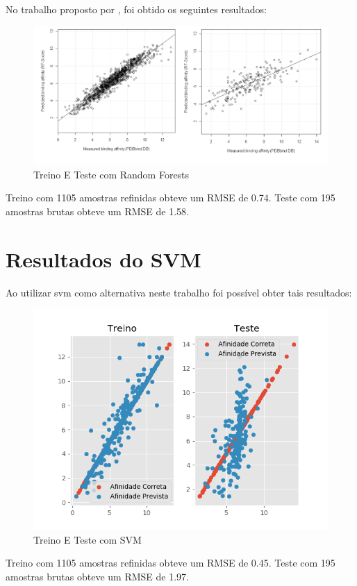 \documentclass[tcc, capa]{texucpel}
\begin{document}
No trabalho proposto por \textbf{\cite{ballester2010machine}}, foi obtido os seguintes resultados:
    \begin{figure}[!htb]
	\centering\includegraphics[width=17cm]{imagens/treino_teste_ballester.png}
	\caption{Treino E Teste com Random Forests}
	\end{figure}
Treino com 1105 amostras refinidas obteve um RMSE de 0.74.
Teste com 195 amostras brutas obteve um RMSE de 1.58.

\section{Resultados do SVM}

Ao utilizar svm como alternativa neste trabalho foi possível obter tais resultados:
    \begin{figure}[!htb]
	\centering\includegraphics[width=17cm]{imagens/teste_treino_meu.png}
	\caption{Treino E Teste com SVM}
	\end{figure}
Treino com 1105 amostras refinidas obteve um RMSE de 0.45.
Teste com 195 amostras brutas obteve um RMSE de 1.97.
\end{document}
